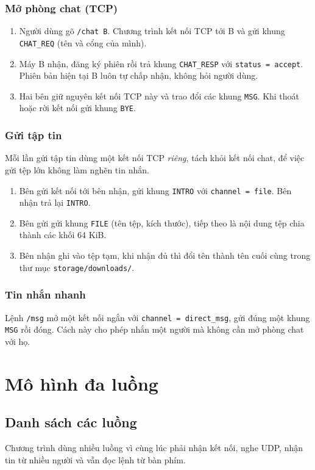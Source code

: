 \documentclass[a4paper,12pt]{article}
\newcommand{\code}[1]{\texttt{#1}}
\begin{document}
\subsubsection{Mở phòng chat (TCP)}
\begin{enumerate}
\item Người dùng gõ \code{/chat B}. Chương trình kết nối TCP tới B và gửi khung \code{CHAT\_REQ} (tên và cổng của mình).
\item Máy B nhận, đăng ký phiên rồi trả khung \code{CHAT\_RESP} với \code{status = accept}. Phiên bản hiện tại B luôn tự chấp nhận, không hỏi người dùng.
\item Hai bên giữ nguyên kết nối TCP này và trao đổi các khung \code{MSG}. Khi thoát hoặc rời kết nối gửi khung \code{BYE}.
\end{enumerate}

\subsubsection{Gửi tập tin}
Mỗi lần gửi tập tin dùng một kết nối TCP \emph{riêng}, tách khỏi kết nối chat, để việc gửi tệp lớn không làm nghẽn tin nhắn.
\begin{enumerate}
\item Bên gửi kết nối tới bên nhận, gửi khung \code{INTRO} với \code{channel = file}. Bên nhận trả lại \code{INTRO}.
\item Bên gửi gửi khung \code{FILE} (tên tệp, kích thước), tiếp theo là nội dung tệp chia thành các khối 64 KiB.
\item Bên nhận ghi vào tệp tạm, khi nhận đủ thì đổi tên thành tên cuối cùng trong thư mục \code{storage/downloads/}.
\end{enumerate}

\subsubsection{Tin nhắn nhanh}
Lệnh \code{/msg} mở một kết nối ngắn với \code{channel = direct\_msg}, gửi đúng một khung \code{MSG} rồi đóng. Cách này cho phép nhắn một người mà không cần mở phòng chat với họ.

\section{Mô hình đa luồng}

\subsection{Danh sách các luồng}
Chương trình dùng nhiều luồng vì cùng lúc phải nhận kết nối, nghe UDP, nhận tin từ nhiều người và vẫn đọc lệnh từ bàn phím.
\end{document}
